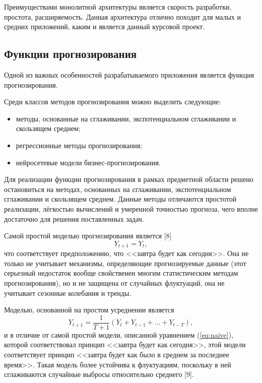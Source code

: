 Преимуществами монолитной архитектуры является скорость разработки, простота, расширяемость. Данная 
архитектура отлично походит для малых и средних приложений, каким и является данный курсовой проект.

\subsection{Функции прогнозирования}
\label{sec:prediction}

Одной из важных особенностей разрабатываемого приложения является функция прогнозирования.

Среди классов методов прогнозирования можно выделить следующие:
\begin{itemize}
  \item методы, основанные на сглаживании, экспотенциальном сглаживании и скользящем среднем;
  \item регрессионные методы прогнозирования;
  \item нейросетевые модели бизнес-прогнозирования.
\end{itemize}

Для реализации функции прогнозирования в рамках предметной области решено остановиться на методах, 
основанных на сглаживании, экспотенциальном сглаживании и скользящем среднем. Данные методы отличаются 
простотой реализации, лёгкостью вычислений и умеренной точностью прогноза, чего вполне достаточно для 
решения поставленных задач.

Самой простой моделью прогнозирования является [8]
\begin{equation} 
Y_{t+1}=Y_t, \label{eq:naive}
\end{equation}
что соответствует предположению, что <<завтра будет как сегодня>>. Она не только не учитывает механизмы, 
определяющие прогнозируемые данные (этот серьезный недостаток вообще свойственен многим статистическим 
методам прогнозирования), но и не защищена от случайных флуктуаций, она не учитывает сезонные колебания и тренды.

Моделью, основанной на простом усреднении является
\begin{equation} 
Y_{t+1}=\frac{1}{T+1}(Y_t+Y_{t-1}+...+Y_{t-T}), \label{eq:avg}
\end{equation}
и в отличие от самой простой модели, описанной уравнением (\ref{eq:naive}), которой соответствовал принцип 
<<завтра будет как сегодня>>, этой модели соответствует принцип <<завтра будет как было в среднем за последнее время>>. 
Такая модель  более устойчива к флуктуациям, поскольку в ней сглаживаются случайные выбросы относительно среднего [9].

